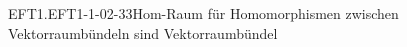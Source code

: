 \begin{EXA}{EFT1.EFT1-1-02-33}{Hom-Raum für Homomorphismen zwischen Vektorraumbündeln sind Vektorraumbündel}

\end{EXA}
